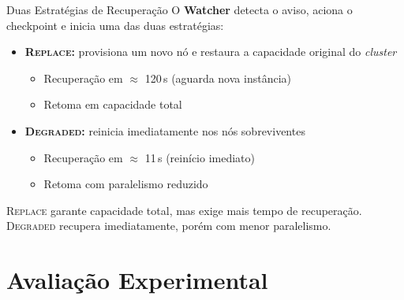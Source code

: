 \documentclass[brazil,aspectratio=169]{lapesd-slides}
\begin{document}
\begin{frame}{Duas Estratégias de Recuperação}
    O \textbf{Watcher} detecta o aviso, aciona o checkpoint e inicia uma das duas estratégias:
    \vspace{0.5em}
    \begin{itemize}
        \item \textbf{\textsc{Replace}:} provisiona um novo nó e restaura a capacidade original do \textit{cluster}
        \begin{itemize}
            \vspace{0.2em}
            \item Recuperação em $\approx$ 120\,s (aguarda nova instância)
            \item Retoma em capacidade total
        \end{itemize}
        \vspace{0.5em}
        \item \textbf{\textsc{Degraded}:} reinicia imediatamente nos nós sobreviventes
        \begin{itemize}
            \vspace{0.2em}
            \item Recuperação em $\approx$ 11\,s (reinício imediato)
            \item Retoma com paralelismo reduzido
        \end{itemize}
    \end{itemize}
    \vspace{0.6em}
    \small\textsc{Replace} garante capacidade total, mas exige mais tempo de recuperação. \textsc{Degraded} recupera imediatamente, porém com menor paralelismo.
\end{frame}

\showsections
\section{Avaliação Experimental}
\end{document}
